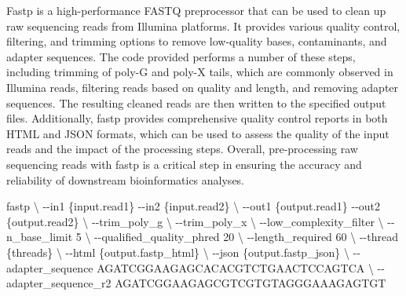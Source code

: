 \documentclass[
]{book}
\newenvironment{Shaded}{\begin{snugshade}}{\end{snugshade}}
\newcommand{\AttributeTok}[1]{\textcolor[rgb]{0.77,0.63,0.00}{#1}}
\newcommand{\DataTypeTok}[1]{\textcolor[rgb]{0.13,0.29,0.53}{#1}}
\newcommand{\ExtensionTok}[1]{#1}
\newcommand{\NormalTok}[1]{#1}
\begin{document}
Fastp is a high-performance FASTQ preprocessor that can be used to clean up raw sequencing reads from Illumina platforms. It provides various quality control, filtering, and trimming options to remove low-quality bases, contaminants, and adapter sequences. The code provided performs a number of these steps, including trimming of poly-G and poly-X tails, which are commonly observed in Illumina reads, filtering reads based on quality and length, and removing adapter sequences. The resulting cleaned reads are then written to the specified output files. Additionally, fastp provides comprehensive quality control reports in both HTML and JSON formats, which can be used to assess the quality of the input reads and the impact of the processing steps. Overall, pre-processing raw sequencing reads with fastp is a critical step in ensuring the accuracy and reliability of downstream bioinformatics analyses.

\small

\begin{Shaded}
\begin{Highlighting}[]
\ExtensionTok{fastp} \DataTypeTok{\textbackslash{}}
      \AttributeTok{{-}{-}in1}\NormalTok{ \{input.read1\} }\AttributeTok{{-}{-}in2}\NormalTok{ \{input.read2\} }\DataTypeTok{\textbackslash{}}
      \AttributeTok{{-}{-}out1}\NormalTok{ \{output.read1\} }\AttributeTok{{-}{-}out2}\NormalTok{ \{output.read2\} }\DataTypeTok{\textbackslash{}}
      \AttributeTok{{-}{-}trim\_poly\_g} \DataTypeTok{\textbackslash{}}
      \AttributeTok{{-}{-}trim\_poly\_x} \DataTypeTok{\textbackslash{}}
      \AttributeTok{{-}{-}low\_complexity\_filter} \DataTypeTok{\textbackslash{}}
      \AttributeTok{{-}{-}n\_base\_limit}\NormalTok{ 5 }\DataTypeTok{\textbackslash{}}
      \AttributeTok{{-}{-}qualified\_quality\_phred}\NormalTok{ 20 }\DataTypeTok{\textbackslash{}}
      \AttributeTok{{-}{-}length\_required}\NormalTok{ 60 }\DataTypeTok{\textbackslash{}}
      \AttributeTok{{-}{-}thread}\NormalTok{ \{threads\} }\DataTypeTok{\textbackslash{}}
      \AttributeTok{{-}{-}html}\NormalTok{ \{output.fastp\_html\} }\DataTypeTok{\textbackslash{}}
      \AttributeTok{{-}{-}json}\NormalTok{ \{output.fastp\_json\} }\DataTypeTok{\textbackslash{}}
      \AttributeTok{{-}{-}adapter\_sequence}\NormalTok{ AGATCGGAAGAGCACACGTCTGAACTCCAGTCA }\DataTypeTok{\textbackslash{}}
      \AttributeTok{{-}{-}adapter\_sequence\_r2}\NormalTok{  AGATCGGAAGAGCGTCGTGTAGGGAAAGAGTGT}
\end{Highlighting}
\end{Shaded}
\end{document}
